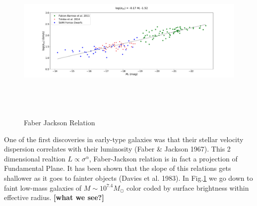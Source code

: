 \documentclass{aa}
\begin{document}
\begin{figure}[!htb]
   \centering
   \includegraphics[width=20cm,height=8cm,keepaspectratio]
   {../2_pipeline/2_FJ_onlydE+useLiter/Faber_Jackson_onlyDWARF+useLiter.pdf}
         \caption{Faber Jackson Relation}
         \label{fig:FJ}
\end{figure}

One of the first discoveries in early-type galaxies was that their stellar velocity dispersion correlates with their luminosity (Faber \& Jackson 1967). This 2 dimensional realtion $L\propto\sigma^\alpha$, Faber-Jackson relation is in fact a projection
 of Fundamental Plane. It has been shown that the slope of this relations gets shallower as it goes to fainter objects (Davies et al. 1983). In Fig.\ref{fig:FJ} we go down to faint low-mass galaxies of $M\sim 10^{7.4}M_\odot$ color coded by surface brightness within effective radius. \textbf{[what we see?]}\\

\end{document}
